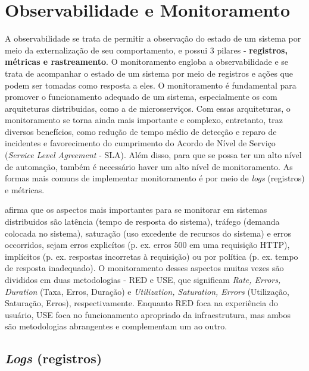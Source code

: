 \section{Observabilidade e Monitoramento}\label{observabilidade-monitoramento}
A observabilidade se trata de permitir a observação do estado de um sistema por meio da externalização de seu comportamento, e possui 3 pilares - \textbf{registros, métricas e rastreamento}. O monitoramento engloba a observabilidade e se trata de acompanhar o estado de um sistema por meio de registros e ações que podem ser tomadas como resposta a eles. O monitoramento é fundamental para promover o funcionamento adequado de um sistema, especialmente os com arquiteturas distribuidas, como a de microsserviços. Com essas arquiteturas, o monitoramento se torna ainda mais importante e complexo, entretanto, traz diversos benefícios, como redução de tempo médio de detecção e reparo de incidentes e favorecimento do cumprimento do Acordo de Nível de Serviço (\emph{Service Level Agreement} - SLA). Além disso, para que se possa ter um alto nível de automação, também é necessário haver um alto nível de monitoramento. As formas mais comuns de implementar monitoramento é por meio de \emph{logs} (registros) e métricas.

 afirma que os aspectos mais importantes para se monitorar em sistemas distribuidos são latência (tempo de resposta do sistema), tráfego (demanda colocada no sistema), saturação (uso excedente de recursos do sistema) e erros occorridos, sejam erros explicítos (p. ex. erros 500 em uma requisição HTTP), implícitos (p. ex. respostas incorretas à requisição) ou por política (p. ex. tempo de resposta inadequado). O monitoramento desses aspectos muitas vezes são divididos em duas metodologias - RED e USE, que significam \emph{Rate, Errors, Duration} (Taxa, Erros, Duração) e \emph{Utilization, Saturation, Errors} (Utilização, Saturação, Erros), respectivamente. Enquanto RED foca na experiência do usuário, USE foca no funcionamento apropriado da infraestrutura, mas ambos são metodologias abrangentes e complementam um ao outro. \cite{livro-sre-google, grafana-blog}


\subsection{\emph{Logs} (registros)}\label{subsecao-registros}

